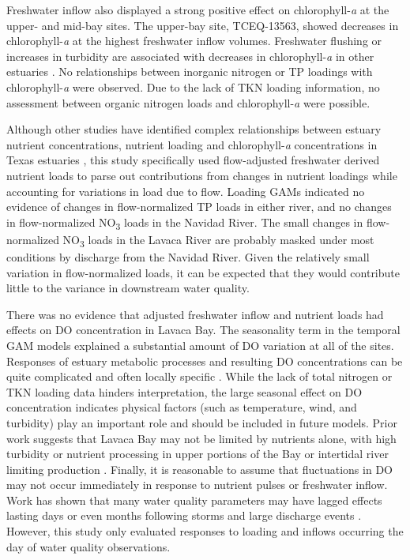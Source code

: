\documentclass[fleqn,10pt,lineno]{wlpeerj} %
\begin{document}
Freshwater inflow also displayed a strong positive effect on
chlorophyll-\emph{a} at the upper- and mid-bay sites. The upper-bay
site, TCEQ-13563, showed decreases in chlorophyll-\emph{a} at the
highest freshwater inflow volumes. Freshwater flushing or increases in
turbidity are associated with decreases in chlorophyll-\emph{a} in other
estuaries
\autocite{peierlsNonmonotonicResponsesPhytoplankton2012,cloernPhytoplanktonPrimaryProduction2014}.
No relationships between inorganic nitrogen or TP loadings with
chlorophyll-\emph{a} were observed. Due to the lack of TKN loading
information, no assessment between organic nitrogen loads and
chlorophyll-\emph{a} were possible.

Although other studies have identified complex relationships between
estuary nutrient concentrations, nutrient loading and
chlorophyll-\emph{a} concentrations in Texas estuaries
\autocite{ornolfsdottirNutrientPulsingRegulator2004,doradoUnderstandingInteractionsFreshwater2015,ciraPhytoplanktonDynamicsLowinflow2021,tominackVariabilityPhytoplanktonBiomass2022},
this study specifically used flow-adjusted freshwater derived nutrient
loads to parse out contributions from changes in nutrient loadings while
accounting for variations in load due to flow. Loading GAMs indicated no
evidence of changes in flow-normalized TP loads in either river, and no
changes in flow-normalized NO\textsubscript{3} loads in the Navidad
River. The small changes in flow-normalized NO\textsubscript{3} loads in
the Lavaca River are probably masked under most conditions by discharge
from the Navidad River. Given the relatively small variation in
flow-normalized loads, it can be expected that they would contribute
little to the variance in downstream water quality.

There was no evidence that adjusted freshwater inflow and nutrient loads
had effects on DO concentration in Lavaca Bay. The seasonality term in
the temporal GAM models explained a substantial amount of DO variation
at all of the sites. Responses of estuary metabolic processes and
resulting DO concentrations can be quite complicated and often locally
specific \autocite{caffreyFactorsControllingNet2004}. While the lack of
total nitrogen or TKN loading data hinders interpretation, the large
seasonal effect on DO concentration indicates physical factors (such as
temperature, wind, and turbidity) play an important role and should be
included in future models. Prior work suggests that Lavaca Bay may not
be limited by nutrients alone, with high turbidity or nutrient
processing in upper portions of the Bay or intertidal river limiting
production \autocite{russell_effect_2006}. Finally, it is reasonable to
assume that fluctuations in DO may not occur immediately in response to
nutrient pulses or freshwater inflow. Work has shown that many water
quality parameters may have lagged effects lasting days or even months
following storms and large discharge events
\autocite{mooneyWatershedExportEvents2012a,wetzExtremeFutureEstuaries2013,bukaveckasInfluenceStormEvents2020,walkerTimescalesMagnitudeWater2021}.
However, this study only evaluated responses to loading and inflows
occurring the day of water quality observations.
\end{document}
